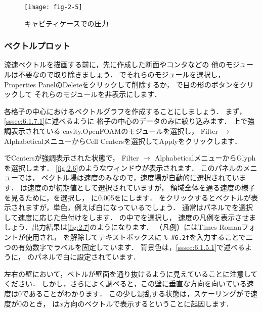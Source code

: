 \begin{figure}[ht]
 \texttt{[image: fig-2-5]}
 \caption{キャビティケースでの圧力}
 \label{fig:2.5}
\end{figure}


\subsubsection{ベクトルプロット}
\label{sssec:2.1.4.2}
流速ベクトルを描画する前に，先に作成した断面やコンタなどの
他のモジュールは不要なので取り除きましょう．
でそれらのモジュールを選択し，
Properties PanelのDeleteをクリックして削除するか，
で目の形のボタンをクリックして
それらのモジュールを非表示にします．

各格子の中心におけるベクトルグラフを作成することにしましょう．
まず，\autoref{sssec:6.1.7.1}に述べるように
格子の中心のデータのみに絞り込みます．
上で強調表示されている
cavity.OpenFOAMのモジュールを選択し，
Filter $\rightarrow$ AlphabeticalメニューからCell Centersを選択してApplyをクリックします．

でCentersが強調表示された状態で，
Filter $\rightarrow$ AlphabeticalメニューからGlyphを選択します．
\autoref{fig:2.6}のようなウィンドウが表示されます．
このパネルのメニューでは，
ベクトル場は速度のみなので，速度場が自動的に選択されています．
は速度のが初期値として選択されていますが，
領域全体を通る速度の様子を見るために，を選択し，
に0.005をにします．
をクリックするとベクトルが表示されますが，単色，例えば白になっているでしょう．
通常はパネルでを選択して速度に応じた色付けをします．
の中でを選択し，
速度の凡例を表示させましょう．出力結果は\autoref{fig:2.7}のようになります．
%
%
（凡例）にはTimes Romanフォントが使用され，
を解除してテキストボックスに
\verb|%-#6.2f|を入力することで二つの有効数字でラベルを固定しています．
背景色は，\autoref{sssec:6.1.5.1}で述べるように，
のパネルで白に設定されています．

左右の壁において，ベトルが壁面を通り抜けるように見えていることに注意してください．
しかし，さらによく調べると，この壁に垂直な方向を向いている速度は$0$であることがわかります．
この少し混乱する状態は，スケーリングがで速度が$0$のとき，
は$x$方向のベクトルで表示するということに起因します．


